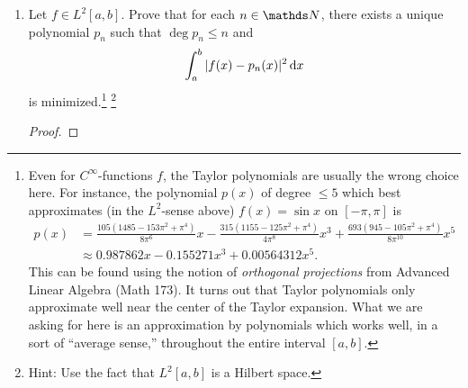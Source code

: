 \documentclass{../homework}
\begin{document}
\begin{Exercise}
\begin{enumerate}
		\item Let \(f \in L^2[a,b]\).  Prove that for each \(n \in \N\),
      there exists a unique polynomial \(p_n\) such that
      \(\deg p_n \leq n\) and
			\begin{equation*}
				\int_a^b | f(x) - p_n(x)|^2 \mathop{}\! \mathrm d x
			\end{equation*}
			is minimized.\footnote{Even for \(C^{\infty}\)-functions \(f\), the
        Taylor polynomials are usually the wrong choice here.  For
        instance, the polynomial \(p(x)\) of degree \(\leq 5\) which best
        approximates (in the \(L^2\)-sense above) \(f(x) = \sin x\) on
        \([-\pi,\pi]\) is
        \begin{align*}
          p(x)
          &= \tfrac{105(1485-153\pi^2 + \pi^4)}{8\pi^6} x
            - \tfrac{315(1155-125\pi^2 + \pi^4)}{4\pi^8} x^3
            + \tfrac{693(945 - 105\pi^2 + \pi^4)}{8 \pi^{10}} x^5\\
          &\approx 0.987862x - 0.155271 x^3 + 0.00564312 x^5.
			\end{align*}
			This can be found using the notion of \emph{orthogonal
        projections} from Advanced Linear Algebra (Math 173).  It
      turns out that Taylor polynomials only approximate well near the
      center of the Taylor expansion.  What we are asking for here is
      an approximation by polynomials which works well, in a sort of
      ``average sense,'' throughout the entire interval \([a,b]\).}
    \footnote{Hint: Use the fact that \(L^2[a,b]\) is a Hilbert space.}

    \begin{solution}
      \begin{proof}

      \end{proof}
    \end{solution}
	\end{enumerate}
\end{Exercise}
\end{document}
